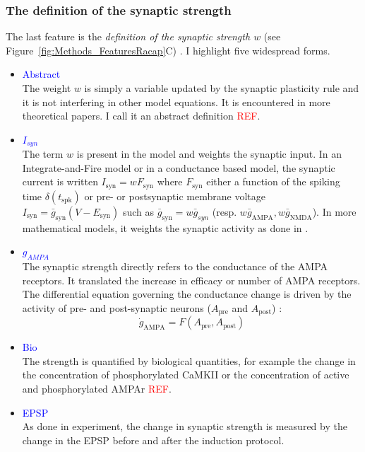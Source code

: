 \subsubsection{The definition of the synaptic strength}
The last feature is the \textit{definition of the synaptic strength $w$} (see Figure~\ref{fig:Methods_FeaturesRacap}C) . I highlight five widespread forms. 
\begin{itemize}
\item \textcolor{blue}{Abstract}\\
The weight $w$ is simply a variable updated by the synaptic plasticity rule and it is not interfering in other model equations. It is encountered in more theoretical papers. I call it an abstract definition \textcolor{red}{REF}. 
\item \textcolor{blue}{$I_{syn}$}\\
The term $w$ is present in the model and weights the synaptic input. In an Integrate-and-Fire model or in a conductance based model,  the synaptic current is written $I_{\mathrm{syn}} = w F_{\mathrm{syn}}$ where $F_{\mathrm{syn}}$ either a function of the spiking time $\delta(t_{\mathrm{spk}})$ or pre- or postsynaptic membrane voltage $I_{\mathrm{syn}} = \bar{g}_{\mathrm{syn}}(V-E_{\mathrm{syn}}) $ such as  $\bar{g}_\mathrm{syn} = w \bar{g}_{syn}$ (resp. $w \bar{g}_{\mathrm{AMPA}}, w \bar{g}_{\mathrm{NMDA}}$). In more mathematical models, it weights the synaptic activity as done in \citep{tetzlaff_synaptic_2013}.
\item \textcolor{blue}{$g_{AMPA}$}\\ 
The synaptic strength directly refers to the conductance of the AMPA receptors. It translated the increase in efficacy or number of AMPA receptors. The differential equation governing the conductance change is driven by the activity of pre- and post-synaptic neurons ($A_{\mathrm{pre}}$ and $A_{\mathrm{post}}$) \citep{berridge_calcium_2014}:
\[ \dot{g}_\mathrm{AMPA} = F(A_{\mathrm{pre}}, A_{\mathrm{post}})\]
\item \textcolor{blue}{Bio}\\
The strength is quantified by biological quantities, for example the change in the concentration of phosphorylated \acrshort{CaMKII} or the concentration of active and phosphorylated AMPAr \textcolor{red}{REF}.
\item \textcolor{blue}{EPSP}\\
As done in experiment, the change in synaptic strength is measured by the change in the \acrshort{EPSP} before and after the induction protocol.
\end{itemize}





